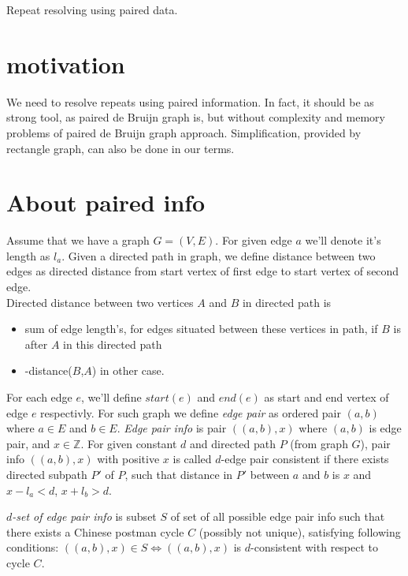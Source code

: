 \documentclass[12pt,a4paper,oneside]{article}
\begin{document}

\begin{center}
Repeat resolving using paired data.
\end{center}
\section{motivation}
  We need to resolve repeats using paired information. In fact, it should be as strong tool, as paired de Bruijn graph is, but without complexity and memory problems of paired de Bruijn graph approach.
Simplification, provided by rectangle graph, can also be done in our terms.  

\section{About paired info}

Assume that we have a graph $G=(V,E)$. 
For given edge $a$ we'll denote it's length as $l_a$.
Given a directed path in graph, we define distance between two edges as directed distance from start vertex of first edge to start vertex of second edge.\\ Directed distance between two vertices $A$ and $B$ in directed path is 
\begin{itemize}
\item
  sum of edge length's, for edges situated between these vertices in path, if $B$ is after $A$ in this directed path
\item
  -distance($B$,$A$) in other case.
\end{itemize}
For each edge $e$, we'll define $start(e)$ and $end(e)$ as start and end vertex of edge $e$ respectivly.
For such graph we define \emph{edge pair} as ordered pair $(a, b)$ where $a \in E$ and $b \in E$.
\emph{Edge pair info} is pair $((a,b), x)$ where $(a,b)$ is edge pair, and $x \in \mathbb{Z}$.
For given constant $d$ and directed path $P$ (from graph $G$), pair info $((a,b), x)$ with positive $x$ is called $d$-edge pair consistent  if there exists directed subpath $P'$ of $P$, such that distance in $P'$ between $a$ and $b$ is $x$ and $x - l_a < d$, $x + l_b > d$.  

\emph{$d$-set of edge pair info} is subset $S$ of set of all possible edge pair info such that there exists a Chinese postman cycle $C$ (possibly not unique), satisfying following conditions:
 $((a, b), x) \in S \Leftrightarrow  ((a, b), x)$ is $d$-consistent with respect to cycle $C$.
  
\end{document}
